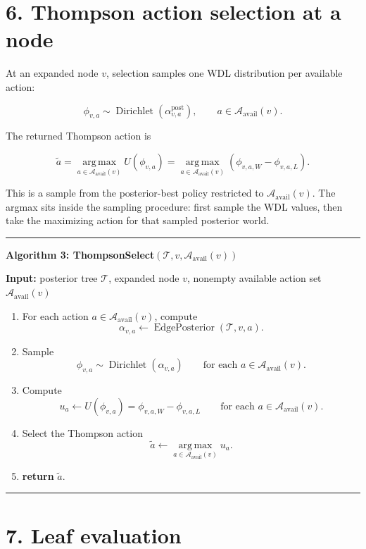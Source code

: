 \documentclass[11pt]{article}
\newcommand{\Dir}{\operatorname{Dirichlet}}
\newcommand{\argmax}{\operatorname*{arg\,max}}
\newcommand{\Tree}{\mathcal{T}}
\newcommand{\Available}{\mathcal{A}_{\mathrm{avail}}}
\newcommand{\Utility}{U}
\newcommand{\EdgePosterior}{\operatorname{EdgePosterior}}
\newenvironment{algorithmblock}[1]
{
  \par\medskip
  \noindent\hrule\par\smallskip
  \noindent\textbf{#1}
  \par\smallskip
}
{
  \par\smallskip\noindent\hrule\par\medskip
}
\newcommand{\Input}{\textbf{Input: }}
\newcommand{\Return}{\textbf{return }}
\begin{document}
\section*{6. Thompson action selection at a node}

At an expanded node \(v\), selection samples one WDL distribution per available
action:

\[
\phi_{v,a}
\sim
\Dir
\left(
\alpha^{\mathrm{post}}_{v,a}
\right),
\qquad
 a \in \Available(v).
\]

The returned Thompson action is

\[
\tilde a
=
\argmax_{a \in \Available(v)}
\Utility(\phi_{v,a})
=
\argmax_{a \in \Available(v)}
\left(
\phi_{v,a,W}-\phi_{v,a,L}
\right).
\]

This is a sample from the posterior-best policy restricted to \(\Available(v)\).
The argmax sits inside the sampling procedure: first sample the WDL values, then
take the maximizing action for that sampled posterior world.

\begin{algorithmblock}{Algorithm 3: ThompsonSelect\((\Tree,v,\Available(v))\)}

\Input posterior tree \(\Tree\), expanded node \(v\), nonempty available action set \(\Available(v)\)

\begin{enumerate}[leftmargin=2em]
  \item For each action \(a \in \Available(v)\), compute
  \[
  \alpha_{v,a}
  \gets
  \EdgePosterior(\Tree,v,a).
  \]

  \item Sample
  \[
  \phi_{v,a}
  \sim
  \Dir(\alpha_{v,a})
  \qquad
  \text{for each } a \in \Available(v).
  \]

  \item Compute
  \[
  u_a
  \gets
  \Utility(\phi_{v,a})
  =
  \phi_{v,a,W}-\phi_{v,a,L}
  \qquad
  \text{for each } a \in \Available(v).
  \]

  \item Select the Thompson action
  \[
  \tilde a
  \gets
  \argmax_{a \in \Available(v)} u_a.
  \]

  \item \Return \(\tilde a\).
\end{enumerate}

\end{algorithmblock}

\section*{7. Leaf evaluation}
\end{document}
